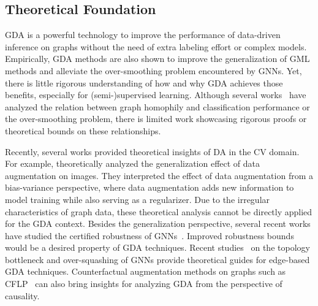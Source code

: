 \documentclass[11pt]{article}
\begin{document}
\subsection{Theoretical Foundation}
GDA is a powerful technology to improve the performance of data-driven inference on graphs without the need of extra labeling effort or complex models. Empirically, GDA methods are also shown to improve the generalization of GML methods and alleviate the over-smoothing problem encountered by GNNs. Yet, there is little rigorous understanding of how and why GDA achieves those benefits, especially for (semi-)supervised learning. Although several works~\cite{zhao2021data,chen2020measuring} have analyzed the relation between graph homophily and classification performance or the over-smoothing problem, there is limited work showcasing rigorous proofs or theoretical bounds on these relationships.

Recently, several works provided theoretical insights of DA in the CV domain. For example, \citet{wu2020generalization} theoretically analyzed the generalization effect of data augmentation on images. They interpreted the effect of data augmentation from a bias-variance perspective, where data augmentation adds new information to model training while also serving as a regularizer. Due to the irregular characteristics of graph data, these theoretical analysis cannot be directly applied for the GDA context. Besides the generalization perspective, several recent works have studied the certified robustness of GNNs~\cite{zugner2020certifiable}. Improved robustness bounds would be a desired property of GDA techniques. Recent studies~\cite{topping2021understanding} on the topology bottleneck and over-squashing of GNNs provide theoretical guides for edge-based GDA techniques. Counterfactual augmentation methods on graphs such as CFLP~\cite{zhao2021counterfactual} can also bring insights for analyzing GDA from the perspective of causality. 

\end{document}
